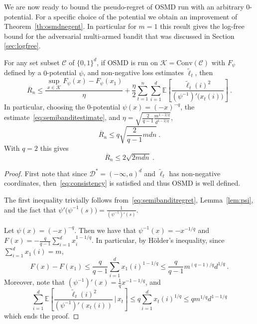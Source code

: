 \documentclass[11pt]{hackednow}
\newcommand{\E}{\mathbb{E}}
\newcommand{\cC}{\mathcal{C}}
\newcommand{\cK}{\mathcal{K}}
\newcommand{\cD}{\mathcal{D}}
\newcommand{\oR}{\overline{R}}
\renewcommand{\tilde}{\widetilde}
\newcommand{\conv}{\mathrm{Conv}}
\begin{document}
%
We are now ready to bound the pseudo-regret of OSMD run with an arbitrary $0$-potential. For a specific choice of the potential we obtain an improvement of Theorem~\ref{th:osmdnegent}. In particular for $m=1$ this result gives the log-free bound for the adversarial multi-armed bandit that was discussed in Section \ref{sec:logfree}.
\begin{theorem} \label{th:osmdzero}
For any set subset $\cC$ of $\{0,1\}^d$, if OSMD is run on $\cK=\conv(\cC)$ with $F_{\psi}$ defined by a $0$-potential $\psi$, and non-negative loss estimates $\tilde{\ell}_t$, then
$$\oR_n \leq \frac{\sup_{x \in \cK} F_{\psi}(x) - F_{\psi}(x_1)}{\eta} + \frac{\eta}{2} \sum_{t=1}^n \sum_{i=1}^d \E\left[\frac{\tilde{\ell}_t(i)^2}{(\psi^{-1})'\bigl(x_t(i)\bigr)}\right]~.$$
In particular, choosing the $0$-potential $\psi(x) = (- x)^{-q}$, the estimate~\eqref{eq:semibanditestimate}, and $\eta= \sqrt{\frac{2}{q-1} \frac{m^{1 - 2/q}}{d^{1 - 2/q}}}$,
$$\oR_n \leq q \sqrt{\frac{2}{q-1} m d n}~.$$
With $q=2$ this gives
$$\oR_n \leq 2 \sqrt{2 m d n}~.$$ 
\end{theorem}
%
\begin{proof}
First note that since $\cD^*=(-\infty,a)^d$ and $\tilde{\ell}_t$ has non-negative coordinates, then~\eqref{eq:consistency} is satisfied and thus OSMD is well defined.

The first inequality trivially follows from~\eqref{eq:semibanditregret}, Lemma~\ref{lem:psi}, and the fact that $\psi'\bigl(\psi^{-1}(s)\bigr) = \frac{1}{(\psi^{-1})'(s)}$.

Let $\psi(x) = (- x)^{-q}$. Then we have that $\psi^{-1}(x) = - x^{-1/q}$ and $F(x)= - \frac{q}{q-1} \sum_{i=1}^d x_i^{1 - 1/q}$. In particular, by H{\"o}lder's inequality, since $\sum_{i=1}^d x_1(i) =m$,
$$F(x) - F(x_1) \leq \frac{q}{q-1} \sum_{i=1}^d x_1(i)^{1 - 1/q} \leq \frac{q}{q-1} m^{(q-1)/q} d^{1/q}~.$$
Moreover, note that $(\psi^{-1})'(x) = \frac1q x^{- 1 - 1/q}$, and
$$\sum_{i=1}^d \E\left[\frac{\tilde{\ell}_t(i)^2}{(\psi^{-1})'(x_t(i))} \,\bigg|\, x_t \right] \leq q \sum_{i=1}^d x_t(i)^{1/q} \leq q m^{1/q} d^{1 - 1/q}$$
which ends the proof.
\end{proof}
\end{document}
